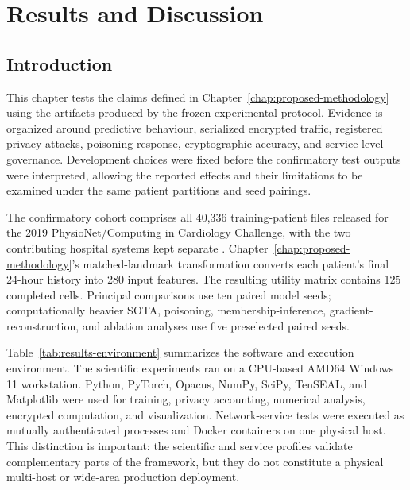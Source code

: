 
\chapter{Results and Discussion}
\label{chap:results-discussion}

\graphicspath{{docs/thesis/figures/chapter4/}{figures/chapter4/}}

\section{Introduction}
\label{sec:results-introduction}

This chapter tests the claims defined in Chapter~\ref{chap:proposed-methodology} using the artifacts produced by the frozen experimental protocol. Evidence is organized around predictive behaviour, serialized encrypted traffic, registered privacy attacks, poisoning response, cryptographic accuracy, and service-level governance. Development choices were fixed before the confirmatory test outputs were interpreted, allowing the reported effects and their limitations to be examined under the same patient partitions and seed pairings.

The confirmatory cohort comprises all 40,336 training-patient files released for the 2019 PhysioNet/Computing in Cardiology Challenge, with the two contributing hospital systems kept separate \cite{reyna2020early,physionet2019sepsis}. Chapter~\ref{chap:proposed-methodology}'s matched-landmark transformation converts each patient's final 24-hour history into 280 input features. The resulting utility matrix contains 125 completed cells. Principal comparisons use ten paired model seeds; computationally heavier SOTA, poisoning, membership-inference, gradient-reconstruction, and ablation analyses use five preselected paired seeds.

Table~\ref{tab:results-environment} summarizes the software and execution environment. The scientific experiments ran on a CPU-based AMD64 Windows 11 workstation. Python, PyTorch, Opacus, NumPy, SciPy, TenSEAL, and Matplotlib were used for training, privacy accounting, numerical analysis, encrypted computation, and visualization. Network-service tests were executed as mutually authenticated processes and Docker containers on one physical host. This distinction is important: the scientific and service profiles validate complementary parts of the framework, but they do not constitute a physical multi-host or wide-area production deployment.

